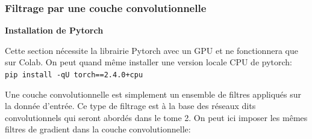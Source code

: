 \documentclass[
  11pt,
  letterpaper,
  open=any,
  twoside=false,
  french]{scrbook}
\begin{document}
\subsubsection{Filtrage par une couche
convolutionnelle}\label{filtrage-par-une-couche-convolutionnelle}

\textbf{Installation de Pytorch}

Cette section nécessite la librairie Pytorch avec un GPU et ne
fonctionnera que sur Colab. On peut quand même installer une version
locale CPU de pytorch: \texttt{pip\ install\ -qU\ torch==2.4.0+cpu}

Une couche convolutionnelle est simplement un ensemble de filtres
appliqués sur la donnée d'entrée. Ce type de filtrage est à la base des
réseaux dits convolutionnels qui seront abordés dans le tome 2. On peut
ici imposer les mêmes filtres de gradient dans la couche
convolutionnelle:
\end{document}
